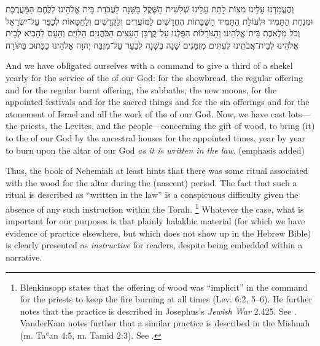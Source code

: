 \begin{hebrewtext}
    וְהֶעֱמַדְנוּ עָלֵינוּ מִצְוֹת לָתֵת עָלֵינוּ שְׁלִשִׁית הַשֶּׁקֶל בַּשָּׁנָה לַעֲבֹדַת בֵּית אֱלֹהֵינוּ׃ 
    לְלֶחֶם הַמַּעֲרֶכֶת וּמִנְחַת הַתָּמִיד וּלְעוֹלַת הַתָּמִיד הַשַּׁבָּתוֹת הֶחֳדָשִׁים לַמּוֹעֲדִים וְלַקֳּדָשִׁים וְלַחַטָּאוֹת לְכַפֵּר עַל־יִשְׂרָאֵל וְכֹל מְלֶאכֶת בֵּית־אֱלֹהֵינוּ׃
    וְהַגּוֹרָלוֹת הִפַּלְנוּ עַל־קֻרְבַּן הָעֵצִים הַכֹּהֲנִים הַלְוִיִּם וְהָעָם לְהָבִיא לְבֵית אֱלֹהֵינוּ לְבֵית־אֲבֹתֵינוּ לְעִתִּים מְזֻמָּנִים שָׁנָה בְשָׁנָה לְבַעֵר עַל־מִזְבַּח יְהוָה אֱלֹהֵינוּ כַּכָּתוּב בַּתּוֹרָה׃
\end{hebrewtext}
\begin{translation}
    And we have obligated ourselves with a command to give a third of a shekel yearly for the service of the \temple of our God:
    for the showbread, the regular offering and for the regular burnt offering, the sabbaths, the new moons, for the appointed festivals and for the sacred things and for the sin offerings and for the atonement of Israel and all the work of the \temple of our God.
    Now, we have cast lots---the priests, the Levites, and the people---concerning the gift of wood, to bring (it) to the \temple of our God by the ancestral houses for the appointed times, year by year to burn upon the altar of \yahweh our God \emph{as it is written in the law}. (emphasis added)
\end{translation}
\noindent
Thus, the book of Nehemiah at least hints that there was some ritual associated with the wood for the altar during the (nascent) \secondtemple period. The fact that such a ritual is described as ``written in the law'' is a conspicuous difficulty given the absence of any such instruction within the Torah.%
    \footnote{%
        Blenkinsopp states that the offering of wood was ``implicit'' in the command for the priests to keep the fire burning at all times (Lev. 6:2, 5--6). He further notes that the practice is described in Josephus's \emph{Jewish War} 2.425. See 
        \cite[317]{blenkinsopp1988}. VanderKam notes further that a similar practice is described in the Mishnah (m. Taʿan 4:5, m. Tamid 2:3). See 
        \cite[636]{vanderkam2018}.}
Whatever the case, what is important for our purposes is that plainly halakhic material (for which we have evidence of practice elsewhere, but which does not show up in the Hebrew Bible) is clearly presented as \emph{instructive} for readers, despite being embedded within a narrative.

